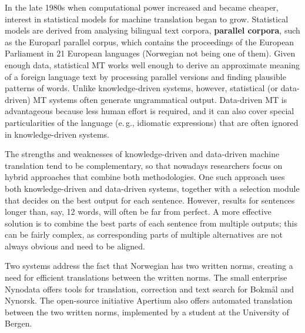 \begin{multicols}{2}
In the late 1980s when computational power increased and became cheaper, interest in statistical models for machine translation began to grow. Statistical models are derived from analysing bilingual text corpora, \textbf{parallel corpora}, such as the Europarl parallel corpus, which contains the proceedings of the European Parliament in 21 European languages
(Norwegian not being one of them).
Given enough data, statistical MT works well enough to derive an approximate meaning of a foreign language text by processing parallel versions and finding plausible patterns of words. Unlike knowledge-driven systems, however, statistical (or data-driven) MT systems often generate ungrammatical output. Data-driven MT is advantageous because less human effort is required, and it can also cover special particularities of the language (e.\,g., idiomatic expressions) that are often ignored in knowledge-driven systems. 

The strengths and weaknesses of knowledge-driven and data-driven machine translation tend to be complementary, so that nowadays researchers focus on hybrid approaches that combine both methodologies. One such approach uses both knowledge-driven and data-driven systems, together with a selection module that decides on the best output for each sentence. However, results for sentences longer than, say, 12 words, will often be far from perfect. A more effective solution is to combine the best parts of each sentence from multiple outputs; this can be fairly complex, as corresponding parts of multiple alternatives are not always obvious and need to be aligned. 


Two systems address the fact that Norwegian has two written norms, creating a need for efficient translations between the written norms. 
The small enterprise Nynodata offers tools for translation, correction and text search for Bokmål and Nynorsk. 
The open-source initiative Apertium also offers automated translation between the two written norms, implemented by a student at the University of Bergen. 


\end{multicols}

